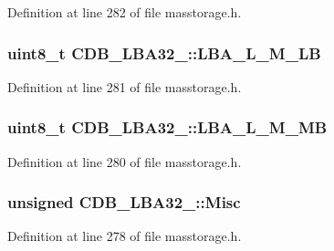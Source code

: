 \-Definition at line 282 of file masstorage.\-h.

\hypertarget{struct_c_d_b___l_b_a32__16_af642464073c45113c7fdf221f40ade1b}{
\subsubsection[{\-L\-B\-A\-\_\-\-L\-\_\-\-M\-\_\-\-L\-B}]{\setlength{\rightskip}{0pt plus 5cm}uint8\-\_\-t {\bf \-C\-D\-B\-\_\-\-L\-B\-A32\-\_\-::\-L\-B\-A\-\_\-\-L\-\_\-\-M\-\_\-\-L\-B}}}\label{struct_c_d_b___l_b_a32__16_af642464073c45113c7fdf221f40ade1b}


\-Definition at line 281 of file masstorage.\-h.

\hypertarget{struct_c_d_b___l_b_a32__16_a4a6ab8304338fa8af41bc180413a4c37}{
\subsubsection[{\-L\-B\-A\-\_\-\-L\-\_\-\-M\-\_\-\-M\-B}]{\setlength{\rightskip}{0pt plus 5cm}uint8\-\_\-t {\bf \-C\-D\-B\-\_\-\-L\-B\-A32\-\_\-::\-L\-B\-A\-\_\-\-L\-\_\-\-M\-\_\-\-M\-B}}}\label{struct_c_d_b___l_b_a32__16_a4a6ab8304338fa8af41bc180413a4c37}


\-Definition at line 280 of file masstorage.\-h.

\hypertarget{struct_c_d_b___l_b_a32__16_a50e5250b635b8782b1a82f4f137feefb}{
\subsubsection[{\-Misc}]{\setlength{\rightskip}{0pt plus 5cm}unsigned {\bf \-C\-D\-B\-\_\-\-L\-B\-A32\-\_\-::\-Misc}}}\label{struct_c_d_b___l_b_a32__16_a50e5250b635b8782b1a82f4f137feefb}


\-Definition at line 278 of file masstorage.\-h.

